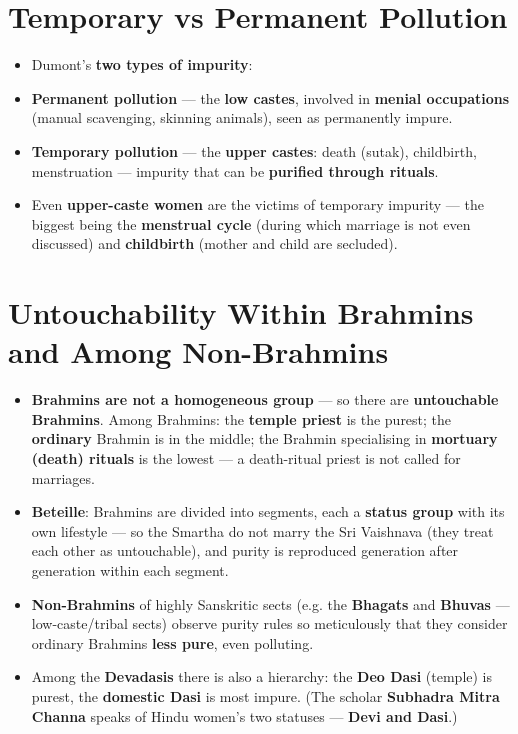 \section{Temporary vs Permanent Pollution}

\begin{KeyConcept}
\begin{itemize}
\item Dumont's \textbf{two types of impurity}:
\item \textbf{Permanent pollution} --- the \textbf{low castes}, involved in \textbf{menial occupations} (manual scavenging, skinning animals), seen as permanently impure.
\item \textbf{Temporary pollution} --- the \textbf{upper castes}: death (sutak), childbirth, menstruation --- impurity that can be \textbf{purified through rituals}.
\item Even \textbf{upper-caste women} are the victims of temporary impurity --- the biggest being the \textbf{menstrual cycle} (during which marriage is not even discussed) and \textbf{childbirth} (mother and child are secluded).
\end{itemize}
\end{KeyConcept}

\section{Untouchability Within Brahmins and Among Non-Brahmins}

\begin{KeyConcept}
\begin{itemize}
\item \textbf{Brahmins are not a homogeneous group} --- so there are \textbf{untouchable Brahmins}. Among Brahmins: the \textbf{temple priest} is the purest; the \textbf{ordinary} Brahmin is in the middle; the Brahmin specialising in \textbf{mortuary (death) rituals} is the lowest --- a death-ritual priest is not called for marriages.
\item \textbf{Beteille}: Brahmins are divided into segments, each a \textbf{status group} with its own lifestyle --- so the Smartha do not marry the Sri Vaishnava (they treat each other as untouchable), and purity is reproduced generation after generation within each segment.
\item \textbf{Non-Brahmins} of highly Sanskritic sects (e.g. the \textbf{Bhagats} and \textbf{Bhuvas} --- low-caste/tribal sects) observe purity rules so meticulously that they consider ordinary Brahmins \textbf{less pure}, even polluting.
\item Among the \textbf{Devadasis} there is also a hierarchy: the \textbf{Deo Dasi} (temple) is purest, the \textbf{domestic Dasi} is most impure. (The scholar \textbf{Subhadra Mitra Channa} speaks of Hindu women's two statuses --- \textbf{Devi and Dasi}.)
\end{itemize}
\end{KeyConcept}

